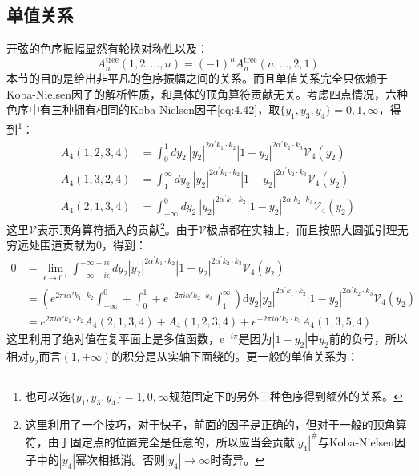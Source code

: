 \subsection{单值关系}
开弦的色序振幅显然有轮换对称性以及：
\begin{equation}
	A_n^{\text{tree}}(1,2,\ldots,n)=(-1)^nA_n^{\text{tree}}(n,\ldots,2,1)
\end{equation}
本节的目的是给出非平凡的色序振幅之间的关系。而且单值关系完全只依赖于Koba-Nielsen因子的解析性质，和具体的顶角算符贡献无关。考虑四点情况，六种色序中有三种拥有相同的Koba-Nielsen因子\ref{eq:4.42}，取$\{y_1,y_3,y_4\}={0,1,\infty}$，得到\footnote{也可以选$\{y_1,y_3,y_4\}={1,0,\infty}$规范固定下的另外三种色序得到额外的关系。}：
\begin{equation}
\begin{aligned}
	A_4(1,2,3,4)&=\int_0^1dy_2~|y_2|^{2\alpha^{\prime}k_1\cdot k_2}|1-y_2|^{2\alpha^{\prime}k_2\cdot k_3}\mathcal{V}_4(y_2)\\
	A_4(1,3,2,4)&=\int_1^\infty dy_2~|y_2|^{2\alpha^{\prime}k_1\cdot k_2}|1-y_2|^{2\alpha^{\prime}k_2\cdot k_3}\mathcal{V}_4(y_2)\\
	A_4\left(2,1,3,4\right)&=\int_{-\infty}^{0}dy_2~|y_2|^{2\alpha^{\prime}k_{1}\cdot k_{2}}|1-y_2|^{2\alpha^{\prime}k_{2}\cdot k_{3}}\mathcal{V}_4(y_2)
\end{aligned}
\end{equation}
这里$\mathcal{V}$表示顶角算符插入的贡献\footnote{这里利用了一个技巧，对于快子，前面的因子是正确的，但对于一般的顶角算符，由于固定点的位置完全是任意的，所以应当会贡献$|y_4|^\#$与Koba-Nielsen因子中的$|y_4|$幂次相抵消。否则$|y_4|\to\infty$时奇异。}。由于$\mathcal{V}$极点都在实轴上，而且按照大圆弧引理无穷远处围道贡献为$0$，得到：
\begin{equation}
\begin{aligned}
		0&=\lim_{\epsilon\to0^+}\int_{-\infty+i\epsilon}^{+\infty+i\epsilon}dy_2|y_2|^{2\alpha^{\prime}k_1\cdot k_2}|1-y_2|^{2\alpha^{\prime}k_2\cdot k_3}\mathcal{V}_4(y_2)\\
	&=\left(e^{2\pi i \alpha' k_1\cdot k_2}\int_{-\infty}^0+\int_0^1+e^{-2\pi i \alpha' k_2\cdot k_3}\int_1^\infty\right)\mathrm{d}y_2|y_2|^{2\alpha^{\prime}k_1\cdot k_2}|1-y_2|^{2\alpha^{\prime}k_2\cdot k_3}\mathcal{V}_4(y_2)\\
	&= e^{2\pi i \alpha' k_1\cdot k_2}A_4(2,1,3,4)+A_4(1,2,3,4)+e^{-2\pi i \alpha' k_2\cdot k_3}A_4(1,3,5,4)
\end{aligned}
\end{equation}
这里利用了绝对值在复平面上是多值函数，$\mathrm{e}^{-i\pi}$是因为$|1-y_2|$中$y_2$前的负号，所以相对$y_2$而言$(1,+\infty)$的积分是从实轴下面绕的。更一般的单值关系为：
